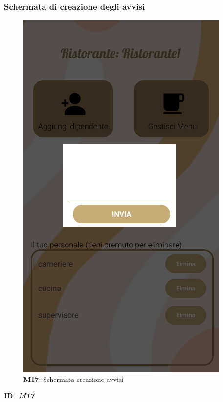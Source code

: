                   \subsubsection{Schermata di creazione degli avvisi}
                      \begin{figure}[H]
                        \centering
                        \includegraphics[scale=0.5]{assets/Mockup/Mockup_SaveAdv.png}
                        \caption*{\textbf{M17}: Schermata creazione avvisi}\label{fig:Mockup_SaveAdv}
                      \end{figure}
            
                      \begin{flushleft}
                        \textbf{ID}   \ \Large{\textit{\textbf{M17}}}
                      \end{flushleft}
            
